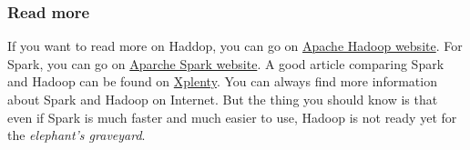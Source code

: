 \subsubsection{Read more}

If you want to read more on Haddop, you can go on \href{http://hadoop.apache.org/}{Apache Hadoop website}. For Spark, you can go on \href{http://spark.apache.org/}{Aparche Spark website}. A good article comparing Spark and Hadoop can be found on \href{https://www.xplenty.com/blog/2014/11/apache-spark-vs-hadoop-mapreduce/}{Xplenty}. You can always find more information about Spark and Hadoop on Internet. But the thing you should know is that even if Spark is much faster and much easier to use, Hadoop is not ready yet for the \emph{elephant's graveyard}.